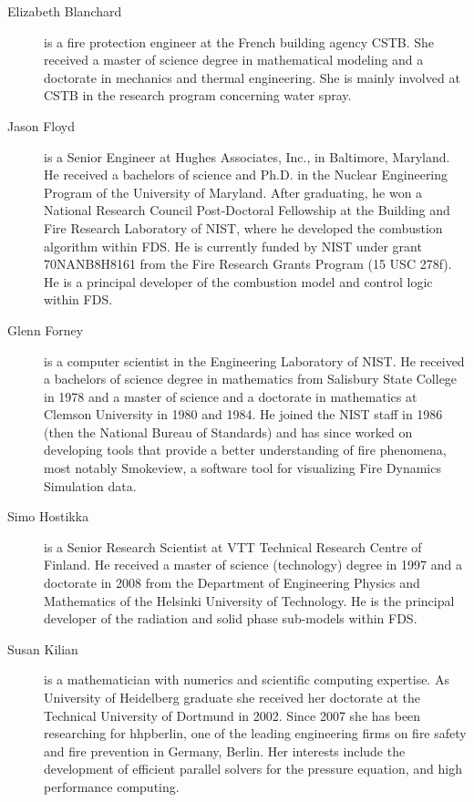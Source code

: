 \begin{description}

\item[Elizabeth Blanchard] is a fire protection engineer at the French building agency CSTB. She received a master of science degree in mathematical modeling and a doctorate in mechanics and thermal engineering. She is mainly involved at CSTB in the research program concerning water spray.

\item[Jason Floyd] is a Senior Engineer at Hughes Associates, Inc., in Baltimore, Maryland. He received a bachelors of science and Ph.D. in the Nuclear Engineering Program of the University of Maryland. After graduating, he won a National Research Council Post-Doctoral Fellowship at the Building and Fire Research Laboratory of NIST, where he developed the combustion algorithm within FDS. He is currently funded by NIST under grant 70NANB8H8161 from the Fire Research Grants Program (15 USC 278f). He is a principal developer of the combustion model and control logic within FDS.

\item[Glenn Forney] is a computer scientist in the Engineering Laboratory of NIST. He received a bachelors of science degree in mathematics from Salisbury State College in 1978 and a master of science and a doctorate in mathematics at Clemson University in 1980 and 1984.  He joined the NIST staff in 1986 (then the National Bureau of Standards) and has since worked on developing tools that provide a better understanding of fire phenomena, most notably Smokeview, a software tool for visualizing Fire Dynamics Simulation data.

\item[Simo Hostikka] is a Senior Research Scientist at VTT Technical Research Centre of Finland. He received a master of science (technology) degree in 1997 and a doctorate in 2008 from the Department of Engineering Physics and Mathematics of the Helsinki University of Technology.  He is the principal developer of the radiation and solid phase sub-models within FDS.

\item[Susan Kilian] is a mathematician with numerics and scientific computing expertise. As University of Heidelberg graduate she received her doctorate at the Technical University of Dortmund in 2002. Since 2007 she has been researching for hhpberlin, one of the leading engineering firms on fire safety and fire prevention in Germany, Berlin. Her interests include the development of efficient parallel solvers for the pressure equation, and high performance computing. 


\end{description}
